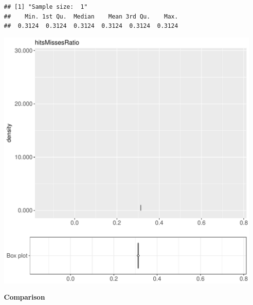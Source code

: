 \documentclass{article}\usepackage[]{graphicx}\usepackage[]{color}
\makeatletter
\def\maxwidth{ %
  \ifdim\Gin@nat@width>\linewidth
    \linewidth
  \else
    \Gin@nat@width
  \fi
}
\newenvironment{kframe}{%
 \def\at@end@of@kframe{}%
 \ifinner\ifhmode%
  \def\at@end@of@kframe{\end{minipage}}%
  \begin{minipage}{\columnwidth}%
 \fi\fi%
 \def\FrameCommand##1{\hskip\@totalleftmargin \hskip-\fboxsep
 \colorbox{shadecolor}{##1}\hskip-\fboxsep
     \hskip-\linewidth \hskip-\@totalleftmargin \hskip\columnwidth}%
 \MakeFramed {\advance\hsize-\width
   \@totalleftmargin\z@ \linewidth\hsize
   \@setminipage}}%
 {\par\unskip\endMakeFramed%
 \at@end@of@kframe}
\newenvironment{knitrout}{}{} %
\makeatother
\begin{document}
\begin{knitrout}
\color{fgcolor}\begin{kframe}
\begin{verbatim}
## [1] "Sample size:  1"
##    Min. 1st Qu.  Median    Mean 3rd Qu.    Max. 
##  0.3124  0.3124  0.3124  0.3124  0.3124  0.3124
\end{verbatim}


{\ttfamily\noindent\bfseries{}}\end{kframe}
\includegraphics[width=\maxwidth]{figure/RH5_trivialcaching_password-1} 

\end{knitrout}
  
 \textbf{Comparison}
  
\end{document}
